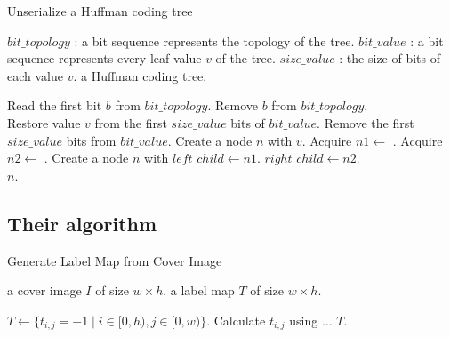 \begin{algorithm}
	\caption{Unserialize a Huffman coding tree}
	
	\begin{algorithmic}[1]
		\Require $bit\_topology$ : a bit sequence represents the topology of the tree.
		\Require $bit\_value$ : a bit sequence represents every leaf value $v$ of the tree.
		\Require $size\_value$ : the size of bits of each value $v$.
		\Ensure a Huffman coding tree.
		
			\State Read the first bit $b$ from $bit\_topology$.
			\State Remove $b$ from $bit\_topology$.
			\\
				\State Restore value $v$ from the first $size\_value$ bits of $bit\_value$.
				\State Remove the first $size\_value$ bits from $bit\_value$.
				\State Create a node $n$ with $v$.
			\Else
				\State Acquire $n1 \gets$ .
				\State Acquire $n2 \gets$ .
				\State Create a node $n$ with
					\State\hspace{\algorithmicindent} $left\_child \gets n1$.
					\State\hspace{\algorithmicindent} $right\_child \gets n2$.
			\EndIf
			\\
			\State \Return $n$.
		\EndFunction
	\end{algorithmic}
\end{algorithm}

\subsection{Their algorithm}

\begin{algorithm}
	\caption{Generate Label Map from Cover Image}
	\label{alg:msb:genlm}
	
	\begin{algorithmic}[1]
		\Require a cover image $I$ of size $w \times h$.
		\Ensure a label map $T$ of size $w \times h$.
		
			\State $T \gets \{t_{i, j} = -1 \mid i \in [0, h), j \in [0, w)\}$.
			\ForAll{$\{x_{i, j} \in I \mid i \in [1, h), j \in [1, w)\}$}
				\State Calculate $t_{i, j}$ using $\dots$
			\EndFor
			\State \Return $T$.
		\EndFunction
	\end{algorithmic}
\end{algorithm}

